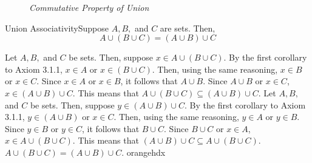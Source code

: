 \begin{figure}[htbp]
    \centering
    \caption{\textit{Commutative Property of Union}}
\end{figure}


\begin{exercise}
    {Union Associativity}Suppose \(A,B,\) and \(C\) are sets. Then, \[A\cup (B\cup C) = (A\cup B) \cup C\] 
\end{exercise}

\sbseteqpf
    {Let \(A,B,\) and \(C\) be sets. Then, suppose \(x\in A\cup (B\cup C)\). By the first corollary to Axiom 3.1.1, \(x\in A\) or \(x\in (B\cup C)\). Then, using the same reasoning, \(x\in B\) or \(x \in C\). Since \(x\in A\) or \(x\in B\), it follows that \(A\cup B\). Since \(A\cup B\) or \(x\in C\), \(x\in (A\cup B) \cup C\). This means that \(A\cup (B\cup C) \subseteq (A\cup B) \cup C\).}
    {Let \(A,B,\) and \(C\) be sets. Then, suppose \(y\in (A\cup B)\cup C\). By the first corollary to Axiom 3.1.1, \(y\in (A\cup B)\) or \(x\in C\). Then, using the same reasoning, \(y\in A\) or \(y\in B\). Since \(y\in B\) or \(y\in C\), it follows that \(B\cup C\). Since \(B\cup C\) or \(x\in A\), \(x\in A\cup (B \cup C)\). This means that \((A\cup B)\cup C \subseteq A\cup (B \cup C)\).}
    {\(A\cup (B\cup C) = (A\cup B) \cup C\).}
    {orangehdx}


